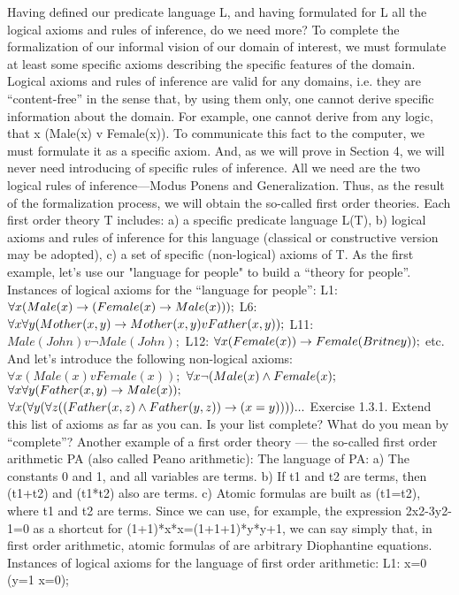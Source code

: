 Having defined our predicate language L, and having formulated for L all the logical axioms and rules of
inference, do we need more?
To complete the formalization of our informal vision of our domain of interest, we must formulate at least
some specific axioms describing the specific features of the domain. Logical axioms and rules of
inference are valid for any domains, i.e. they are ``content-free'' in the sense that, by using them only, one
cannot derive specific information about the domain.
For example, one cannot derive from any logic, that \forall x (Male(x) v Female(x)). To communicate this fact
to the computer, we must formulate it as a specific axiom.
And, as we will prove in Section 4, we will never need introducing of specific rules of inference. All we
need are the two logical rules of inference---Modus Ponens and Generalization.
Thus, as the result of the formalization process, we will obtain the so-called first order theories.
Each first order theory T includes:
a) a specific predicate language L(T),
b) logical axioms and rules of inference for this language (classical or constructive version may be
adopted),
c) a set of specific (non-logical) axioms of T.
As the first example, let's use our "language for people" to build a ``theory for people''.
Instances of logical axioms for the ``language for people'':
L1: \(\forall x(Male(x)\rightarrow (Female(x)\rightarrow Male(x)));\)
L6: \(\forall x\forall y(Mother(x, y)\rightarrow Mother(x, y) v Father(x, y));\)
L11: \(Male(John) v \neg Male(John);\)
L12: \(\forall x(Female(x))\rightarrow Female(Britney));\)
etc.
And let's introduce the following non-logical axioms:
\(\forall x (Male(x) v Female(x));\)
\(\forall x \neg (Male(x) \wedge  Female(x);\)
\(\forall x\forall y (Father (x, y)\rightarrow Male(x));\)
\(\forall x(\forall y(\forall z((Father(x, z)\wedge Father(y,z))\rightarrow (x=y)))) ...\)
Exercise 1.3.1. Extend this list of axioms as far as you can. Is your list complete? What do you mean by ``complete''?
Another example of a first order theory --- the so-called first order arithmetic PA (also called Peano arithmetic):
The language of PA:
a) The constants 0 and 1, and all variables are terms.
b) If t1 and t2 are terms, then (t1+t2) and (t1*t2) also are terms.
c) Atomic formulas are built as (t1=t2), where t1 and t2 are terms.
Since we can use, for example, the expression 2x2-3y2-1=0 as a shortcut for (1+1)*x*x=(1+1+1)*y*y+1, we can say simply
that, in first order arithmetic, atomic formulas of are arbitrary Diophantine equations.
Instances of logical axioms for the language of first order arithmetic:
L1: x=0 \IMPLIES  (y=1 \IMPLIES  x=0);
